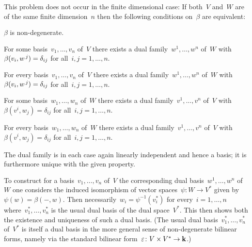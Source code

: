\begin{recall}
  This problem does not occur in the finite dimensional case:
  If both~$V$ and~$W$ are of the same finite dimension~$n$ then the following conditions on~$\beta$ are equivalent:
  \begin{equivalenceslist}
    \item
      $\beta$ is non-degenerate.
    \item
      For some basis~$v_1, \dotsc, v_n$ of~$V$ there exists a dual family~$w^1, \dotsc, w^n$ of~$W$ with~$\beta(v_i, w^{\, j}) = \delta_{ij}$ for all~$i, j = 1, \dotsc, n$.
    \item
      For every basis~$v_1, \dotsc, v_n$ of~$V$ there exists a dual family~$w^1, \dotsc, w^n$ of~$W$ with~$\beta(v_i, w^{\, j}) = \delta_{ij}$ for all~$i, j = 1, \dotsc, n$.
    \item
      For some basis~$w_1, \dotsc, w_n$ of~$W$ there exists a dual family~$v^1, \dotsc, v^n$ of~$V$ with~$\beta(v^i, w_j) = \delta_{ij}$ for all~$i, j = 1, \dotsc, n$.
    \item
      For every basis~$w_1, \dotsc, w_n$ of~$W$ there exists a dual family~$v^1, \dotsc, v^n$ of~$V$ with~$\beta(v^i, w_j) = \delta_{ij}$ for all~$i, j = 1, \dotsc, n$.
  \end{equivalenceslist}
  The dual family is in each case again linearly independent and hence a basis;
  it is furthermore unique with the given property.
  
  To construct for a basis~$v_1, \dotsc, v_n$ of~$V$ the corresponding dual basis~$w^1, \dotsc, w^n$ of~$W$ one considers the induced isomorphism of vector spaces~$\psi \colon W \to V^*$ given by~$\psi(w) = \beta(-,w)$.
  Then necessarily~$w_i = \psi^{-1}(v_i^*)$ for every~$i = 1, \dotsc, n$ where~$v_1^*, \dotsc, v_n^*$ is the usual dual basis of the dual space~$V^*$.
  This then shows both the existence and uniqueness of such a dual basis.
  (The usual dual basis~$v_1^*, \dotsc, v_n^*$ of~$V^*$ is itself a dual basis in the more general sense of non-degenerate bilinear forms, namely via the standard bilinear form~$\varepsilon \colon V \times V^* \to \mathbf{k}$.)
\end{recall}


